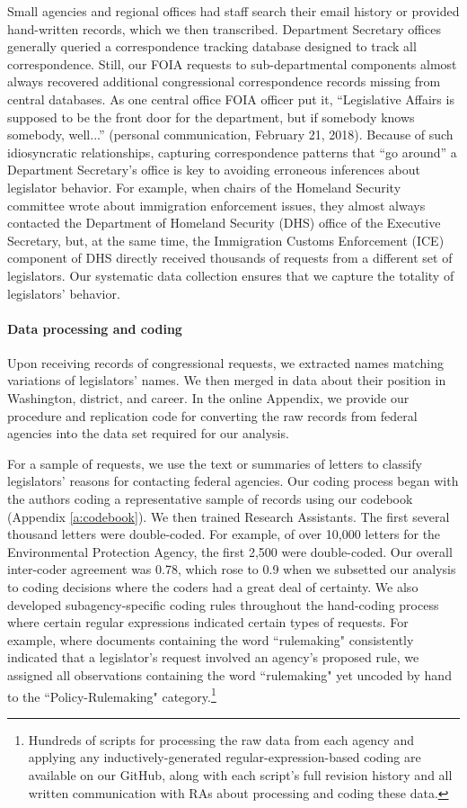\documentclass[12pt]{article}
\begin{document}
Small agencies and regional offices had staff search their email history or provided hand-written records, which we then transcribed. Department Secretary offices generally queried a correspondence tracking database designed to track all correspondence. Still, our FOIA requests to sub-departmental components almost always recovered additional congressional correspondence records missing from central databases. As one central office FOIA officer put it, ``Legislative Affairs is supposed to be the front door for the department, but if somebody knows somebody, well...'' (personal communication, February 21, 2018). Because of such idiosyncratic relationships, capturing correspondence patterns that ``go around'' a Department Secretary's office is key to avoiding erroneous inferences about legislator behavior. For example, when chairs of the Homeland Security committee wrote about immigration enforcement issues, they almost always contacted the Department of Homeland Security (DHS) office of the Executive Secretary, but, at the same time, the Immigration Customs Enforcement (ICE) component of DHS directly received thousands of requests from a different set of legislators. Our systematic data collection ensures that we capture the totality of legislators' behavior.

\paragraph{Data processing and coding} Upon receiving records of congressional requests, we extracted names matching variations of legislators' names. We then merged in data about their position in Washington, district, and career. In the online Appendix, we provide our procedure and replication code for converting the raw records from federal agencies into the data set required for our analysis. 

For a sample of  requests, we use the text or summaries of letters to classify legislators' reasons for contacting federal agencies. Our coding process began with the authors coding a representative sample of records using our codebook (Appendix \ref{a:codebook}). We then trained Research Assistants. The first several thousand letters were double-coded. For example, of over 10,000 letters for the Environmental Protection Agency, the first 2,500 were double-coded. Our overall inter-coder agreement was 0.78, which rose to 0.9 when we subsetted our analysis to coding decisions where the coders had a great deal of certainty. We also developed subagency-specific coding rules throughout the hand-coding process where certain regular expressions indicated certain types of requests. For example, where documents containing the word ``rulemaking" consistently indicated that a legislator's request involved an agency's proposed rule, we assigned all observations containing the word ``rulemaking" yet uncoded by hand to the ``Policy-Rulemaking" category.\footnote{Hundreds of scripts for processing the raw data from each agency and applying any inductively-generated regular-expression-based coding are available on our GitHub, along with each script's full revision history and all written communication with RAs about processing and coding these data.}
\end{document}
